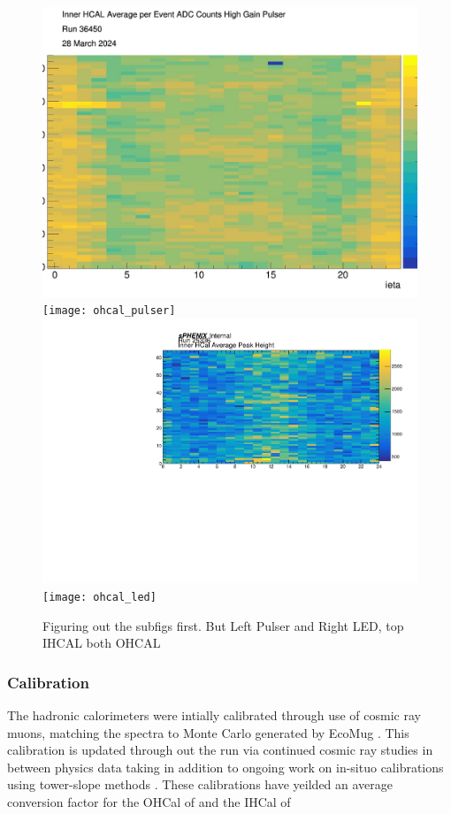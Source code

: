 \documentclass[letterpaper, 12pt, oneside]{book}
\theoremstyle{definition}
\begin{document}
		\begin{figure}
			\includegraphics{ihcal_pulser}
			\texttt{[image: ohcal\_pulser]}
			\includegraphics{ihcal_led}
			\texttt{[image: ohcal\_led]}
			\caption{Figuring out the subfigs first. But Left Pulser and Right LED, top IHCAL both OHCAL}
			\label{fig:hcal_tests}
		\end{figure}
		\subsubsection{Calibration}
			The hadronic calorimeters were intially calibrated through use of cosmic ray muons, matching the spectra to Monte Carlo 
			generated by EcoMug \cite{HCal_Calib}. 
			This calibration is updated through out the run via continued cosmic ray studies in between physics data taking in addition
			to ongoing work on in-situo calibrations using tower-slope methods \cite{tower_slope_hcal}. 
			These calibrations have yeilded an average conversion factor for the OHCal of and the IHCal of %
\end{document}
